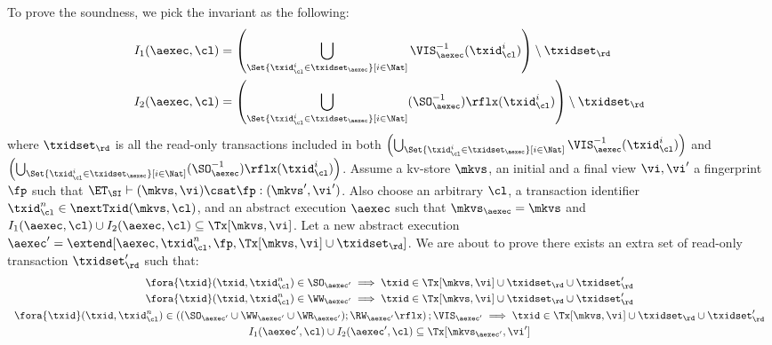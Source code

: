 To prove the soundness, we pick the invariant as the following:
\begin{align*}
    I_1(\aexec, \cl) & = \left( \bigcup_{\Set{\txid_{\cl}^{i} \in \txidset_{\aexec} }[ i \in \Nat ]} \VIS_{\aexec}^{-1}(\txid^i_\cl) \right) \setminus \txidset_\rd \\
    I_2(\aexec, \cl) & = \left( \bigcup_{\Set{\txid_{\cl}^{i} \in \txidset_{\aexec} }[ i \in \Nat ]} (\SO_{\aexec}^{-1})\rflx(\txid^i_\cl) \right) \setminus \txidset_\rd
\end{align*}
where \( \txidset_\rd \) is all the read-only transactions included in both 
\( \left( \bigcup_{\Set{\txid_{\cl}^{i} \in \txidset_{\aexec} }[ i \in \Nat ]} \VIS_{\aexec}^{-1}(\txid^i_\cl) \right)\) 
and \( \left( \bigcup_{\Set{\txid_{\cl}^{i} \in \txidset_{\aexec} }[ i \in \Nat ]} (\SO_{\aexec}^{-1})\rflx(\txid^i_\cl) \right) \).
Assume a kv-store $\mkvs$, an initial and a final view $\vi, \vi'$  a fingerprint $\fp$ 
such that $\ET_{\SI} \vdash (\mkvs, \vi) \csat \fp: (\mkvs',\vi')$. 
Also choose an arbitrary $\cl$, a transaction identifier $\txid_\cl^n \in \nextTxid(\mkvs, \cl)$, 
and an abstract execution $\aexec$ such that $\mkvs_{\aexec} = \mkvs$ and 
\( I_1(\aexec, \cl) \cup I_2(\aexec, \cl) \subseteq \Tx[\mkvs, \vi] \).
Let a new abstract execution \( \aexec' = \extend[\aexec, \txid_\cl^n, \fp, \Tx[\mkvs, \vi] \cup \txidset_\rd]\).
We are about to prove there exists an extra set of read-only transaction \( \txidset'_\rd \) such that:
\begin{gather}
    \fora{\txid} (\txid, \txid_\cl^n) \in \SO_{\aexec'} \implies \txid \in \Tx[\mkvs, \vi] \cup \txidset_\rd \cup \txidset'_\rd \label{equ:si-sound-update-so}\\
    \fora{\txid} (\txid, \txid_\cl^n) \in \WW_{\aexec'} \implies \txid \in \Tx[\mkvs, \vi] \cup \txidset_\rd \cup \txidset'_\rd \label{equ:si-sound-update-ww}\\
    \begin{array}{l}
    \fora{\txid} (\txid, \txid_\cl^n) \in \left( (\SO_{\aexec'} \cup \WW_{\aexec'} \cup \WR_{\aexec'} ) ; \RW_{\aexec'}\rflx \right) ; \VIS_{\aexec'} 
    \implies \txid \in \Tx[\mkvs, \vi] \cup \txidset_\rd \cup \txidset'_\rd 
    \end{array}
    \label{equ:si-sound-update-arvis}\\
    I_1(\aexec',\cl) \cup I_2(\aexec',\cl) \subseteq \Tx[\mkvs_{\aexec'}, \vi'] \label{equ:si-sound-inv} 
\end{gather}
